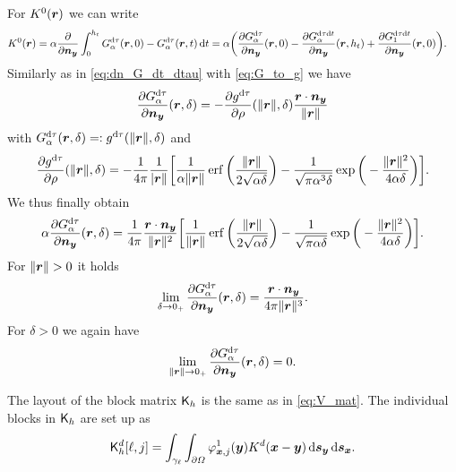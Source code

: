 \documentclass[a4paper,11pt]{article}
\begin{document}
For $K^0({{\bm{r}}})$ we can write
\begin{align*}
  K^0({{\bm{r}}}) &= \alpha\frac{\partial}{\partial {\ensuremath{{\bm{n}}}}_{{\bm{y}}}} \int_{0}^{h_t} G^{{\mathrm{d}} \tau}_\alpha({{\bm{r}}},0) - G^{{\mathrm{d}} \tau}_\alpha({{\bm{r}}}, t) \,{\mathrm{d}} t 
  = \alpha \bigg( \frac{\partial G^{{\mathrm{d}}\tau}_\alpha}{\partial {\ensuremath{{\bm{n}}}}_{{\bm{y}}}} ({{\bm{r}}},0) - \frac{\partial G^{{\mathrm{d}}\tau{\mathrm{d}} t}_\alpha}{\partial {\ensuremath{{\bm{n}}}}_{{\bm{y}}}}({{\bm{r}}},h_t) + \frac{\partial G^{{\mathrm{d}}\tau{\mathrm{d}} t}_1}{\partial {\ensuremath{{\bm{n}}}}_{{\bm{y}}}}({{\bm{r}}},0) \bigg).
\end{align*}
Similarly as in \eqref{eq:dn_G_dt_dtau} with \eqref{eq:G_to_g} we have
\begin{equation*}
  \frac{\partial G^{{\mathrm{d}}\tau}_\alpha}{\partial {\ensuremath{{\bm{n}}}}_{{\bm{y}}}}({{\bm{r}}},\delta) = -\frac{\partial g^{{\mathrm{d}}\tau}}{\partial \rho}(\|{{\bm{r}}}\|,\delta) \frac{{{\bm{r}}} \cdot {\ensuremath{{\bm{n}}}}_{{\bm{y}}}}{\|{{\bm{r}}}\|}
\end{equation*}
with $G^{{\mathrm{d}}\tau}_\alpha({{\bm{r}}},\delta) =: g^{{\mathrm{d}}\tau}(\|{{\bm{r}}}\|,\delta)$ and 
\begin{equation*}
  \frac{\partial g^{{\mathrm{d}}\tau}}{\partial \rho}(\|{{\bm{r}}}\|,\delta) = -\frac{1}{4\pi} \frac{1}{|{{\bm{r}}}\|}\bigg[ \frac{1}{\alpha\|{{\bm{r}}}\|} \operatorname{erf}\bigg( \frac{\|{{\bm{r}}}\|}{2\sqrt{\alpha\delta}} \bigg) - \frac{1}{\sqrt{\pi\alpha^3\delta}} \exp\bigg( -\frac{\|{{\bm{r}}}\|^2}{4\alpha\delta} \bigg) \bigg].
\end{equation*}
We thus finally obtain
\begin{equation}
\label{eq:dn_G_dtau}
  \alpha \frac{\partial G^{{\mathrm{d}}\tau}_\alpha}{\partial {\ensuremath{{\bm{n}}}}_{{\bm{y}}}}({{\bm{r}}},\delta) = \frac{1}{4\pi} \frac{{{\bm{r}}} \cdot {\ensuremath{{\bm{n}}}}_{{\bm{y}}}}{\|{{\bm{r}}}\|^2}\bigg[ \frac{1}{\|{{\bm{r}}}\|} \operatorname{erf}\bigg( \frac{\|{{\bm{r}}}\|}{2\sqrt{\alpha\delta}} \bigg) - \frac{1}{\sqrt{\pi\alpha\delta}} \exp\bigg( -\frac{\|{{\bm{r}}}\|^2}{4\alpha\delta} \bigg) \bigg].
\end{equation}
For $\|{{\bm{r}}}\| > 0$ it holds
\begin{equation}
\label{eq:dn_G_dtau_lim_r}
  \lim_{\delta \to 0_+} \frac{\partial G^{{\mathrm{d}}\tau}_\alpha}{\partial {\ensuremath{{\bm{n}}}}_{{\bm{y}}}}({{\bm{r}}},\delta) = \frac{ {{\bm{r}}} \cdot {\ensuremath{{\bm{n}}}}_{{\bm{y}}}}{4\pi\|{{\bm{r}}}\|^3}.
\end{equation}
For $\delta > 0$ we again have
\begin{equation*}
  \lim_{\|{{\bm{r}}}\| \to 0_+} \frac{\partial G^{{\mathrm{d}}\tau}_\alpha}{\partial {\ensuremath{{\bm{n}}}}_{{\bm{y}}}}({{\bm{r}}},\delta) = 0.
\end{equation*}

The layout of the block matrix ${{\mathsf{K}}}_h$ is the same as in \eqref{eq:V_mat}. The individual blocks in ${{\mathsf{K}}}_h$ are set up as
\begin{equation*}
  {\ensuremath{{\mathsf{K}}}}^d_h[ \ell , j ] = \int_{\gamma_\ell} \int_{\partial\Omega} \varphi^1_{{{\bm{x}}},j}({{\bm{y}}}) K^d({{\bm{x}}}-{{\bm{y}}}) \,{\mathrm{d}}{{\bm{s}}}_{{\bm{y}}} \,{\mathrm{d}}{{\bm{s}}}_{{\bm{x}}}.
\end{equation*}
\end{document}
